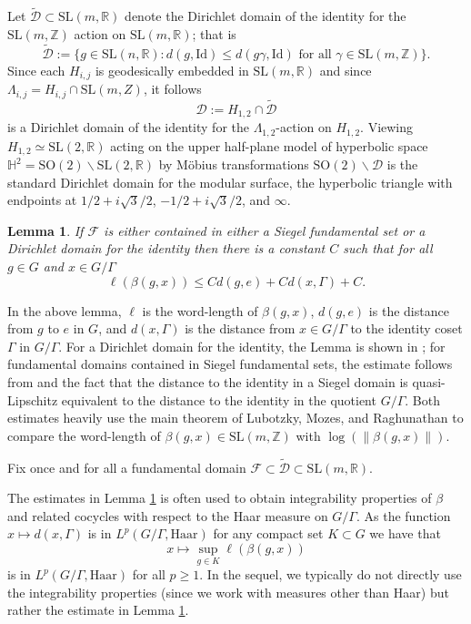 \documentclass[10pt,reqno]{amsart}
\theoremstyle{Theorem}
\newtheorem{lemma}[theorem]{Lemma}
\theoremstyle{definition}
\theoremstyle{remark}
\newcommand{\wtd}{\widetilde}
\newcommand{\R}{\mathbb {R}}
\newcommand{\Z}{\mathbb {Z}}
\newcommand{\Sl}{\mathrm{SL}}
\newcommand{\So}{\mathrm{SO}}
\newcommand{\id}{\mathrm{Id}}
\def\blue{}
\begin{document}
{\blue Let $\wtd {\mathcal D} \subset \Sl(m,\R)$ denote the Dirichlet domain of the identity for the $\Sl(m,\Z)$ action on $\Sl(m,\R)$; that is
$$\wtd {\mathcal D}:= \{ g\in \Sl(n,\R): d(g,\id) \le d(g\gamma, \id) \text{ for all $\gamma\in \Sl(m,\Z)$}\}.$$
Since each $H_{i,j}$ is geodesically embedded in $\Sl(m,\R)$ and since $\Lambda_{i,j} = H_{i,j} \cap \Sl(m,Z)$, it follows
\begin{equation} \label{eq:dirc}\mathcal D := H_{1,2} \cap  \wtd {\mathcal D}\end{equation}
is a Dirichlet domain of the identity for the $\Lambda_{1,2}$-action on $H_{1,2}$.  %
Viewing $H_{1,2}\simeq \Sl(2,\R)$ acting  on the upper half-plane model of hyperbolic space $\mathbb H^2= \So(2)\backslash \Sl(2,\R)$ by M\"obius transformations ${\So(2)\backslash \mathcal D}$ is the standard Dirichlet domain for the modular surface, the hyperbolic triangle with endpoints at $1/2 + i\sqrt 3/2$, $-1/2 + i\sqrt 3/2$, and $\infty$.
}



\begin{lemma}
\label{lemma:fromlmr}
If $\mathcal F$ is either contained in either a Siegel fundamental set or a Dirichlet domain for the identity then
there is a constant $C$ such that  for all $g\in G$ and $x\in G/\Gamma$ $$\ell (\beta(g,x)) \leq C d(g,e)+ C d(x, \Gamma) + C.$$
\end{lemma}
In the above lemma, $\ell$ is the word-length of $\beta(g,x)$, $d(g,e)$ is the distance from $g$ to $e$ in $G$, and $d(x, \Gamma)$ is the distance from $x\in G/\Gamma$ to the identity coset $\Gamma$ in $G/\Gamma$.
For a Dirichlet domain for the identity, the Lemma is shown in \cite[\S 2]{MR1767270}; for fundamental domains contained in Siegel fundamental sets, the estimate follows from  \cite[Corollary 3.19]{MR2039990} and   the fact that the distance to the identity in a  Siegel domain is quasi-Lipschitz equivalent to the distance to the identity in the quotient   $G/\Gamma$.   Both estimates heavily use
the main theorem of Lubotzky, Mozes, and Raghunathan \cite{MR1244421,MR1828742} to compare the word-length of $\beta(g,x)\in \Sl(m,\Z)$ with   $\log(\|\beta(g,x)\|)$. %

{\blue  Fix once and for all a fundamental domain $\mathcal F\subset \wtd {\mathcal D} \subset \Sl(m,\R)$.}


The estimates in  Lemma \ref{lemma:fromlmr} is often used to obtain integrability properties of $\beta$ and   related cocycles with respect  to the Haar measure on $G/\Gamma$.
As the function $x\mapsto d(x, \Gamma)$ is in  $L^p(G/\Gamma,\mathrm{Haar})$ for any compact set $K\subset G$ we have that $$x\mapsto \sup _{g\in K} \ell(\beta (g,x))$$ is in $L^p(G/\Gamma,\text{Haar})$ for all $p\ge 1$.
In the sequel, we typically do not directly use the integrability properties  (since we work with measures other than Haar)  but rather  the   estimate in Lemma \ref{lemma:fromlmr}.
\end{document}
